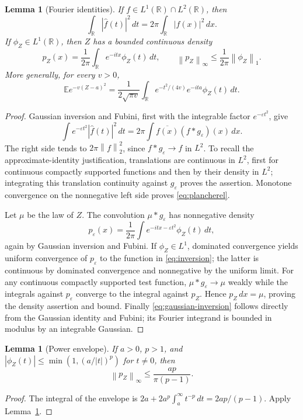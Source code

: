 \documentclass[11pt]{article}
\numberwithin{equation}{section}
\newtheorem{lemma}[theorem]{Lemma}
\theoremstyle{definition}\newtheorem{definition}[theorem]{Definition}
\theoremstyle{remark}\newtheorem{remark}[theorem]{Remark}
\newcommand{\R}{\mathbb R}\newcommand{\E}{\mathbb E}\newcommand{\PP}{\mathbb P}
\newcommand{\1}{\mathbf 1}\newcommand{\diag}{\operatorname{diag}}
\newcommand{\norm}[1]{\left\lVert#1\right\rVert}\newcommand{\abs}[1]{\left|#1\right|}
\begin{document}
\begin{lemma}[Fourier identities]\label{lem:fourier}
If $f\in L^1(\R)\cap L^2(\R)$, then
\begin{equation}\label{eq:plancherel}
 \int_\R|\widehat f(t)|^2\,dt=2\pi\int_\R|f(x)|^2\,dx.
\end{equation}
If $\phi_Z\in L^1(\R)$, then $Z$ has a bounded continuous density
\begin{equation}\label{eq:inversion}
 p_Z(x)=\frac1{2\pi}\int_\R e^{-itx}\phi_Z(t)\,dt,
 \qquad \norm{p_Z}_\infty\le\frac1{2\pi}\norm{\phi_Z}_1.
\end{equation}
More generally, for every $v>0$,
\begin{equation}\label{eq:gaussian-inversion}
 \E e^{-v(Z-a)^2}
 =\frac1{2\sqrt{\pi v}}\int_\R e^{-t^2/(4v)}e^{-ita}\phi_Z(t)\,dt.
\end{equation}
\end{lemma}
\begin{proof}
Gaussian inversion and Fubini, first with the integrable factor $e^{-\varepsilon t^2}$, give
\[
 \int e^{-\varepsilon t^2}|\widehat f(t)|^2\,dt
 =2\pi\int \overline{f(x)}(f*g_\varepsilon)(x)\,dx.
\]
The right side tends to $2\pi\norm f_2^2$, since $f*g_\varepsilon\to f$ in $L^2$. To recall the approximate-identity justification, translations are continuous in $L^2$, first for continuous compactly supported functions and then by their density in $L^2$; integrating this translation continuity against $g_\varepsilon$ proves the assertion. Monotone convergence on the nonnegative left side proves \eqref{eq:plancherel}.

Let $\mu$ be the law of $Z$. The convolution $\mu*g_\varepsilon$ has nonnegative density
\[
 p_\varepsilon(x)=\frac1{2\pi}\int e^{-itx-\varepsilon t^2}\phi_Z(t)\,dt,
\]
again by Gaussian inversion and Fubini. If $\phi_Z\in L^1$, dominated convergence yields uniform convergence of $p_\varepsilon$ to the function in \eqref{eq:inversion}; the latter is continuous by dominated convergence and nonnegative by the uniform limit. For any continuous compactly supported test function, $\mu*g_\varepsilon\to\mu$ weakly while the integrals against $p_\varepsilon$ converge to the integral against $p_Z$. Hence $p_Z\,dx=\mu$, proving the density assertion and bound. Finally \eqref{eq:gaussian-inversion} follows directly from the Gaussian identity and Fubini; its Fourier integrand is bounded in modulus by an integrable Gaussian.
\end{proof}

\begin{lemma}[Power envelope]\label{lem:envelope}
If $a>0$, $p>1$, and $|\phi_Z(t)|\le\min(1,(a/|t|)^p)$ for $t\ne0$, then
\begin{equation}\label{eq:envelope}
 \norm{p_Z}_\infty\le\frac{ap}{\pi(p-1)}.
\end{equation}
\end{lemma}
\begin{proof}
The integral of the envelope is $2a+2a^p\int_a^\infty t^{-p}\,dt=2ap/(p-1)$. Apply Lemma~\ref{lem:fourier}.
\end{proof}
\end{document}

